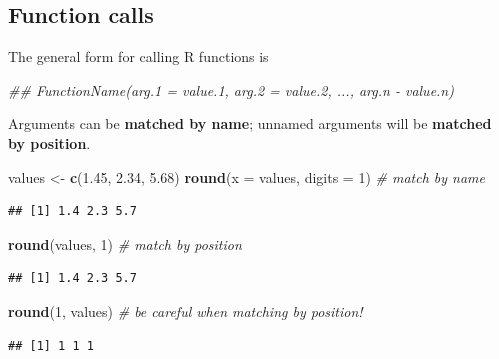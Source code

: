 \documentclass[]{book}
\newenvironment{Shaded}{\begin{snugshade}}{\end{snugshade}}
\newcommand{\CommentTok}[1]{\textcolor[rgb]{0.56,0.35,0.01}{\textit{#1}}}
\newcommand{\DataTypeTok}[1]{\textcolor[rgb]{0.13,0.29,0.53}{#1}}
\newcommand{\DecValTok}[1]{\textcolor[rgb]{0.00,0.00,0.81}{#1}}
\newcommand{\FloatTok}[1]{\textcolor[rgb]{0.00,0.00,0.81}{#1}}
\newcommand{\KeywordTok}[1]{\textcolor[rgb]{0.13,0.29,0.53}{\textbf{#1}}}
\newcommand{\NormalTok}[1]{#1}
\newcommand{\StringTok}[1]{\textcolor[rgb]{0.31,0.60,0.02}{#1}}
\begin{document}
\hypertarget{function-calls}{%
\subsection{Function calls}\label{function-calls}}

The general form for calling R functions is

\begin{Shaded}
\begin{Highlighting}[]
\CommentTok{## FunctionName(arg.1 = value.1, arg.2 = value.2, ..., arg.n - value.n)}
\end{Highlighting}
\end{Shaded}

Arguments can be \textbf{matched by name}; unnamed arguments will be \textbf{matched by position}.

\begin{Shaded}
\begin{Highlighting}[]
\NormalTok{values <-}\StringTok{ }\KeywordTok{c}\NormalTok{(}\FloatTok{1.45}\NormalTok{, }\FloatTok{2.34}\NormalTok{, }\FloatTok{5.68}\NormalTok{)}
\KeywordTok{round}\NormalTok{(}\DataTypeTok{x =}\NormalTok{ values, }\DataTypeTok{digits =} \DecValTok{1}\NormalTok{) }\CommentTok{# match by name}
\end{Highlighting}
\end{Shaded}

\begin{verbatim}
## [1] 1.4 2.3 5.7
\end{verbatim}

\begin{Shaded}
\begin{Highlighting}[]
\KeywordTok{round}\NormalTok{(values, }\DecValTok{1}\NormalTok{) }\CommentTok{# match by position}
\end{Highlighting}
\end{Shaded}

\begin{verbatim}
## [1] 1.4 2.3 5.7
\end{verbatim}

\begin{Shaded}
\begin{Highlighting}[]
\KeywordTok{round}\NormalTok{(}\DecValTok{1}\NormalTok{, values) }\CommentTok{# be careful when matching by position!}
\end{Highlighting}
\end{Shaded}

\begin{verbatim}
## [1] 1 1 1
\end{verbatim}
\end{document}

